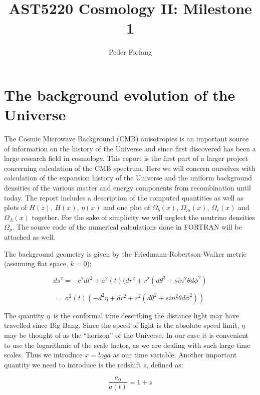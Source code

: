 \documentclass[norsk,a4paper,12pt]{article}
\begin{document}
\title{AST5220 Cosmology II: Milestone 1}
\author{Peder Forfang}
\maketitle



\section{The background evolution of the Universe}
The Cosmic Microwave Background (CMB) anisotropies is an important source of information on the history of the Universe and since first discovered has been a large research field in cosmology. This report is the first part of a larger project concerning calculation of the CMB spectrum. Here we will concern ourselves with calculation of the expansion history of the Universe and the uniform background densities of the various matter and energy components from recombination until today. The report includes a description of the computed quantities as well as plots of $H(z)$, $H(x)$, $\eta (x)$ and one plot of $\Omega_b(x)$, $\Omega_m(x)$, $\Omega_r(x)$ and $\Omega_{\Lambda}(x)$ together. For the sake of simplicity we will neglect the neutrino densities $\Omega_{\nu}$. The source code of the numerical calculations done in FORTRAN will be attached as well.

The background geometry is given by the Friedmann-Robertson-Walker metric (assuming flat space, $k=0$):

\begin{equation}
 ds^2 = -c^2dt^2 + a^2(t)(dr^2 + r^2(d\theta^2 + sin^2\theta d\phi^2) 
\end{equation}

\begin{equation}
 = a^2(t)(-d^2\eta + dr^2 + r^2(d\theta^2 + sin^2\theta d\phi^2))
\end{equation}

The quantity $\eta$ is the conformal time describing the distance light may have travelled since Big Bang. Since the speed of light is the absolute speed limit, $\eta$ may be thought of as the ``horizon'' of the Universe. In our case it is convenient to use the logarithmic of the scale factor, as we are dealing with such large time scales. Thus we introduce $x = log a$ as our time variable. Another important quantity we need to introduce is the redshift $z$, defined as:

\begin{equation}
 \frac{a_0}{a(t)} = 1 + z
\end{equation}
\end{document}
